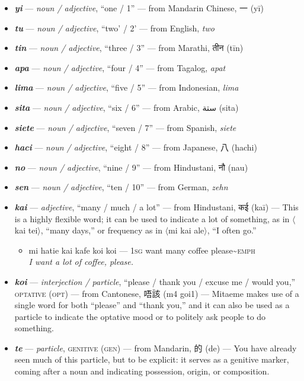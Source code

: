 \documentclass[a4paper]{article}
\begin{document}
\begin{itemize}
	\item \textbf{\textit{yi}} —  \textit{noun / adjective}, ``one / 1'' — from Mandarin Chinese, 一 (yī)
	\item \textbf{\textit{tu}} —  \textit{noun / adjective}, ``two' / 2' — from English, \textit{two}
	\item \textbf{\textit{tin}} —  \textit{noun / adjective}, ``three / 3'' — from Marathi, {\hmfont तीन} (tīn)
	\item \textbf{\textit{apa}} —  \textit{noun / adjective}, ``four / 4'' — from Tagalog, \textit{apat}
	\item \textbf{\textit{lima}} —  \textit{noun / adjective}, ``five / 5'' — from Indonesian, \textit{lima}
	\item \textbf{\textit{sita}} —  \textit{noun / adjective}, ``six / 6'' — from Arabic, {\afont  ستة } (sita)
	\item \textbf{\textit{siete}} —  \textit{noun / adjective}, ``seven / 7'' — from Spanish, \textit{siete}
	\item \textbf{\textit{haci}} —  \textit{noun / adjective}, ``eight / 8'' — from Japanese, 八 (hachi)
	\item \textbf{\textit{no}} —  \textit{noun / adjective}, ``nine / 9'' — from Hindustani, {\hmfont नौ} (nau)
	\item \textbf{\textit{sen}} —  \textit{noun / adjective}, ``ten / 10'' — from German, \textit{zehn}
	\item \textbf{\textit{kai}} —  \textit{adjective}, ``many / much / a lot'' — from Hindustani, {\hmfont कई} (kaī) — This is a highly flexible word; it can be used to indicate a lot of something, as in $\langle$kai tei$\rangle$, ``many days,'' or frequency as in $\langle$mi kai ale$\rangle$, ``I often go.''
	\begin{itemize}
		\item mi hatie kai kafe koi koi — \textsc{1sg} want many coffee please\textasciitilde{}\textsc{emph} \\\textit{I want a lot of coffee, please.}
	\end{itemize}
	\item \textbf{\textit{koi}} —  \textit{interjection / particle}, ``please / thank you / excuse me / would you,'' \textsc{optative (opt)} — from Cantonese, 唔該 (m4 goi1) — Mitaeme makes use of a single word for both ``please'' and ``thank you,'' and it can also be used as a particle to indicate the optative mood or to politely ask people to do something.
	\item \textbf{\textit{te}} —  \textit{particle}, \textsc{genitive (gen)} — from Mandarin, 的 (de) — You have already seen much of this particle, but to be explicit: it serves as a genitive marker, coming after a noun and indicating possession, origin, or composition.

\end{itemize}
\end{document}
